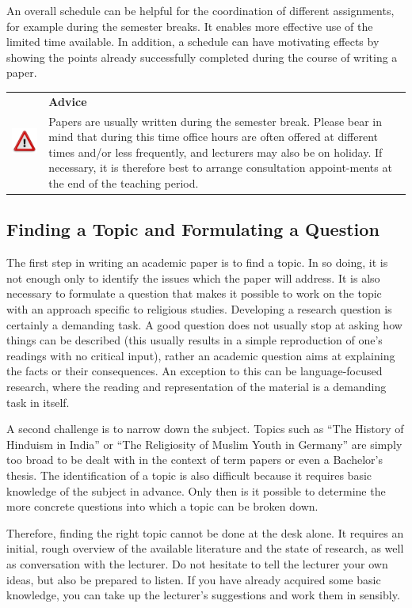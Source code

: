 \documentclass[
  english,
]{scrreprt}
\newlength{\iconwidth}
\newenvironment{displaybox}[2]{%
    \begin{center}
        \setlength\arrayrulewidth{0.75pt}%
        \arrayrulecolor{white}%
        \renewcommand{\arraystretch}{1.3}%
        \begin{tabular}{p{\iconwidth}p{\linewidth-4\tabcolsep-\iconwidth}}
            \multirow{2}{*}{#2}&\cellcolor{boxheadcol}\textbf{\sffamily\color{white}#1} \\%
            \hhline{~-}%
            &\cellcolor{boxcol}%
}{%
            \\
        \end{tabular}
        \arrayrulecolor{black}
    \end{center}
}
\newenvironment{Advice}{%
\begin{displaybox}{Advice}{\includegraphics[width=\iconwidth]{images/icon-hinweis}}}%
{\end{displaybox}}
\begin{document}
An overall schedule can be helpful for the coordination of different assignments, for example during the semester breaks. It enables more effective use of the limited time available. In addition, a schedule can have motivating effects by showing the points already successfully completed during the course of writing a paper.

\begin{Advice}

Papers are usually written during the semester break. Please bear in mind that during this time office hours are often offered at different times and/or less frequently, and lecturers may also be on holiday. If necessary, it is therefore best to arrange consultation appoint-ments at the end of the teaching period.

\end{Advice}

\subsection{Finding a Topic and Formulating a Question}\label{finding-a-topic-and-formulating-a-question}

The first step in writing an academic paper is to find a topic. In so doing, it is not enough only to identify the issues which the paper will address. It is also necessary to formulate a question that makes it possible to work on the topic with an approach specific to religious studies. Developing a research question is certainly a demanding task. A good question does not usually stop at asking how things can be described (this usually results in a simple reproduction of one’s readings with no critical input), rather an academic question aims at explaining the facts or their consequences. An exception to this can be language-focused research, where the reading and representation of the material is a demanding task in itself.

A second challenge is to narrow down the subject. Topics such as “The History of Hinduism in India” or “The Religiosity of Muslim Youth in Germany” are simply too broad to be dealt with in the context of term papers or even a Bachelor’s thesis. The identification of a topic is also difficult because it requires basic knowledge of the subject in advance. Only then is it possible to determine the more concrete questions into which a topic can be broken down.

Therefore, finding the right topic cannot be done at the desk alone. It requires an initial, rough overview of the available literature and the state of research, as well as conversation with the lecturer. Do not hesitate to tell the lecturer your own ideas, but also be prepared to listen. If you have already acquired some basic knowledge, you can take up the lecturer’s suggestions and work them in sensibly.
\end{document}
